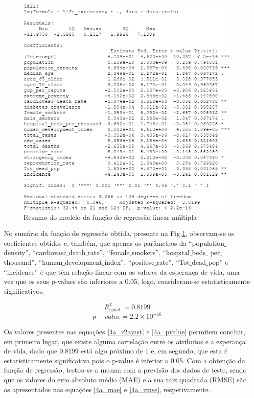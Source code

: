 \documentclass[conference]{IEEEtran}
\begin{document}
\begin{figure}[htbp]
\centerline{\includegraphics[width=0.95\columnwidth]{images/04_1.png}}
\caption{Resumo do modelo da função de regressão linear múltipla}
\label{4a}
\end{figure}

No sumário da função de regressão obtida, presente na Fig.\ref{4a}, observam-se os coeficientes obtidos e, também, que apenas os parâmetros da “population$\_$density”, “cardiovasc$\_$death$\_$rate”, “female$\_$smokers”, “hospital$\_$beds$\_$ per$\_$thousand”, “human$\_$development$\_$index”, “positive$\_$rate”, “Tot$\_$dead$\_$pop” e “incidence” é que têm relação linear com os valores da esperança de vida, uma vez que os seus p-values são inferiores a 0.05, logo, consideram-se estatisticamente significativos.

\begin{equation}
R^{2}_{ajust.} = 0.8199\label{4a_r2ajust}
\end{equation}
\begin{equation}
p-value = 2.2\times 10^{-16}\label{4a_pvalue}
\end{equation}

Os valores presentes nas equações \eqref{4a_r2ajust} e \eqref{4a_pvalue} permitem concluir, em primeiro lugar, que existe alguma correlação entre os atributos e a esperança de vida, dado que 0.8199 está algo próximo de 1 e, em segundo, que esta é estatisticamente significativa pois o p-value é inferior a 0.05.
Com a obtenção da função de regressão, testou-se a mesma com a previsão dos dados de teste, sendo que os valores do erro absoluto médio (MAE) e a sua raiz quadrada (RMSE) são os apresentados nas equações \eqref{4a_mae} e \eqref{4a_rmse}, respetivamente.
\end{document}
